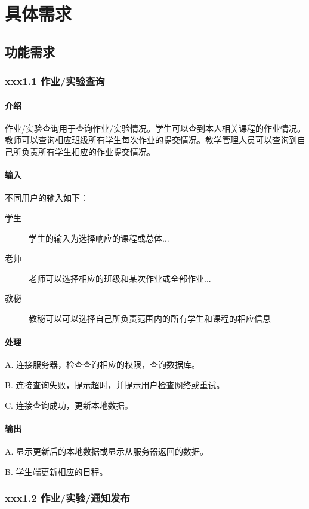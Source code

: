 \chapter{具体需求}
  \section{功能需求}
    \subsection{xxx1.1 作业/实验查询}
      \subsubsection{介绍}
	 作业/实验查询用于查询作业/实验情况。学生可以查到本人相关课程的作业情况。教师可以查询相应班级所有学生每次作业的提交情况。教学管理人员可以查询到自己所负责所有学生相应的作业提交情况。
	 \subsubsection{输入}
    	 不同用户的输入如下：
    	 \begin{center}\begin{description}
         \item[学生] 学生的输入为选择响应的课程或总体...
         \item[老师] 老师可以选择相应的班级和某次作业或全部作业...
         \item[教秘] 教秘可以可以选择自己所负责范围内的所有学生和课程的相应信息
    	 \end{description}\end{center}
	 \subsubsection{处理}
	 A. 连接服务器，检查查询相应的权限，查询数据库。

	 B. 连接查询失败，提示超时，并提示用户检查网络或重试。

	 C. 连接查询成功，更新本地数据。

	 \subsubsection{输出}
	 A. 显示更新后的本地数据或显示从服务器返回的数据。

	 B. 学生端更新相应的日程。

    \subsection{xxx1.2 作业/实验/通知发布}
